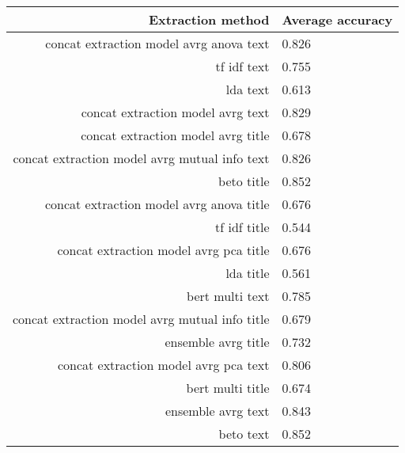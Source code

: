 \begin{tabular}{|r|l|}
  \hline
  Extraction method & Average accuracy \\ 
  \hline
  concat extraction model avrg anova text & 0.826 \\ 
  \hline
  tf idf text & 0.755 \\ 
  \hline
  lda text & 0.613 \\ 
  \hline
  concat extraction model avrg text & 0.829 \\ 
  \hline
  concat extraction model avrg title & 0.678 \\ 
  \hline
  concat extraction model avrg mutual info text & 0.826 \\ 
  \hline
  beto title & 0.852 \\ 
  \hline
  concat extraction model avrg anova title & 0.676 \\ 
  \hline
  tf idf title & 0.544 \\ 
  \hline
  concat extraction model avrg pca title & 0.676 \\ 
  \hline
  lda title & 0.561 \\ 
  \hline
  bert multi text & 0.785 \\ 
  \hline
  concat extraction model avrg mutual info title & 0.679 \\ 
  \hline
  ensemble avrg title & 0.732 \\ 
  \hline
  concat extraction model avrg pca text & 0.806 \\ 
  \hline
  bert multi title & 0.674 \\ 
  \hline
  ensemble avrg text & 0.843 \\ 
  \hline
  beto text & 0.852 \\ 
  \hline
\end{tabular}
